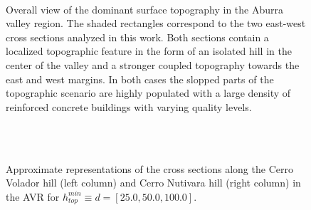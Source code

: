 \documentclass[11pt,letterpaper]{article}
\begin{document}
\begin{figure}[H]
	\centering
	\\
	\caption{\small Overall view of the dominant surface topography in the Aburra valley region. The shaded rectangles correspond to the two east-west cross sections analyzed in this work. Both sections contain a localized topographic feature in the form of an isolated hill in the center of the valley and a stronger coupled topography towards the east and west margins. In both cases the slopped parts of the topographic scenario are highly populated with a large density of reinforced concrete buildings with varying quality levels.}
	\label{fig:secciones}
\end{figure}


\begin{figure}[H]
	\centering
        \\
	 \\
	\caption{\small Approximate representations of the cross sections along the Cerro Volador hill (left column) and Cerro Nutivara hill (right column) in the AVR for $h_{top}^{min} \equiv d = [25.0 , 50.0 , 100.0]$.}
	\label{fig:prox_mods}
\end{figure}
\end{document}
